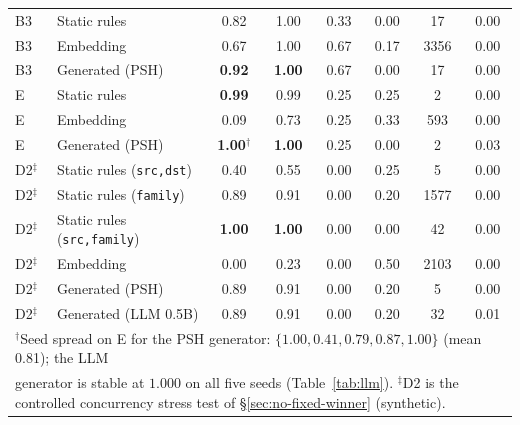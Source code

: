 \begin{table}[t]
{\begin{tabular}{llcccccc}
\addlinespace[2pt]
B3 & Static rules & 0.82 & 1.00 & 0.33 & 0.00 & 17 & 0.00 \\
B3 & Embedding & 0.67 & 1.00 & 0.67 & 0.17 & 3356 & 0.00 \\
B3 & Generated (PSH) & \textbf{0.92} & \textbf{1.00} & 0.67 & 0.00 & 17 & 0.00 \\
\addlinespace[2pt]
E & Static rules & \textbf{0.99} & 0.99 & 0.25 & 0.25 & 2 & 0.00 \\
E & Embedding & 0.09 & 0.73 & 0.25 & 0.33 & 593 & 0.00 \\
E & Generated (PSH) & \textbf{1.00}$^{\dagger}$ & \textbf{1.00} & 0.25 & 0.00 & 2 & 0.03 \\
\addlinespace[2pt]
D2$^{\ddagger}$ & Static rules (\texttt{src,dst}) & 0.40 & 0.55 & 0.00 & 0.25 & 5 & 0.00 \\
D2$^{\ddagger}$ & Static rules (\texttt{family}) & 0.89 & 0.91 & 0.00 & 0.20 & 1577 & 0.00 \\
D2$^{\ddagger}$ & Static rules (\texttt{src,family}) & \textbf{1.00} & \textbf{1.00} & 0.00 & 0.00 & 42 & 0.00 \\
D2$^{\ddagger}$ & Embedding & 0.00 & 0.23 & 0.00 & 0.50 & 2103 & 0.00 \\
D2$^{\ddagger}$ & Generated (PSH) & 0.89 & 0.91 & 0.00 & 0.20 & 5 & 0.00 \\
D2$^{\ddagger}$ & Generated (LLM 0.5B) & 0.89 & 0.91 & 0.00 & 0.20 & 32 & 0.01 \\
\bottomrule
\multicolumn{8}{l}{\footnotesize $^{\dagger}$Seed spread on E for the
PSH generator: $\{1.00, 0.41, 0.79, 0.87, 1.00\}$ (mean 0.81); the LLM}\\
\multicolumn{8}{l}{\footnotesize generator is stable at $1.000$ on all
five seeds (Table~\ref{tab:llm}). $^{\ddagger}$D2 is the controlled
concurrency stress test of \S\ref{sec:no-fixed-winner} (synthetic).}
\end{tabular}}
\end{table}
